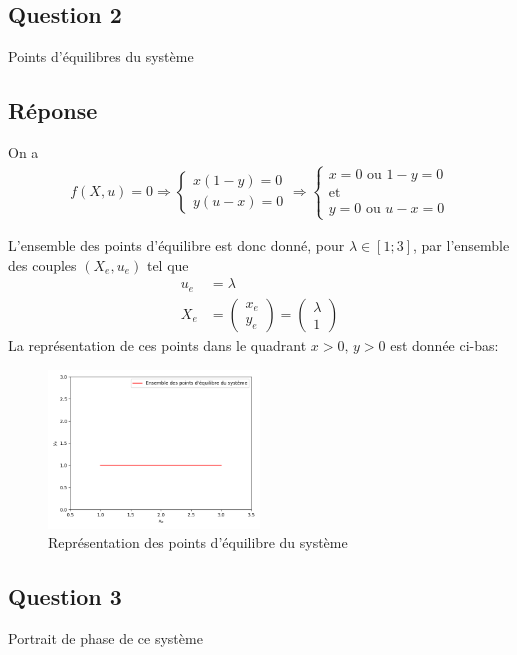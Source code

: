 \documentclass[
	french,
	11pt, %
]{fphw}
\newcommand{\myvec}[2]{\begin{pmatrix} #1  \\ #2 \end{pmatrix}}   %
\begin{document}
\subsection*{Question 2}
\begin{problem}
	Points d'équilibres du système
\end{problem}
	
\subsection*{Réponse}
On a 
\begin{align*}
	f(X,u)=0 \Rightarrow 
	\begin{cases}
	x(1-y)=0 \\
	y(u-x)=0	
	\end{cases}
	\Rightarrow 
	\begin{cases}
	x=0 \text{ ou } 1-y=0 \\
	\text{et} \\
	y=0 \text{ ou } u-x=0
	\end{cases}
\end{align*}

L'ensemble des points d'équilibre est donc donné, pour $\lambda \in [1;3]$, par l'ensemble des couples $(X_e,u_e)$ tel que 
\begin{align*}
u_e &= \lambda \\
X_e &= \myvec{x_e}{y_e}= \myvec{\lambda}{1}
\end{align*}
La représentation de ces points dans le quadrant $x>0, \, y>0$ est donnée ci-bas:
\begin{figure}[h]
    \centering
    \includegraphics[width=0.5\textwidth]{NewEq.png}
    \caption{Représentation des points d'équilibre du système}
\end{figure}



\subsection*{Question 3}
\begin{problem}
	Portrait de phase de ce système
\end{problem}
	
\end{document}
